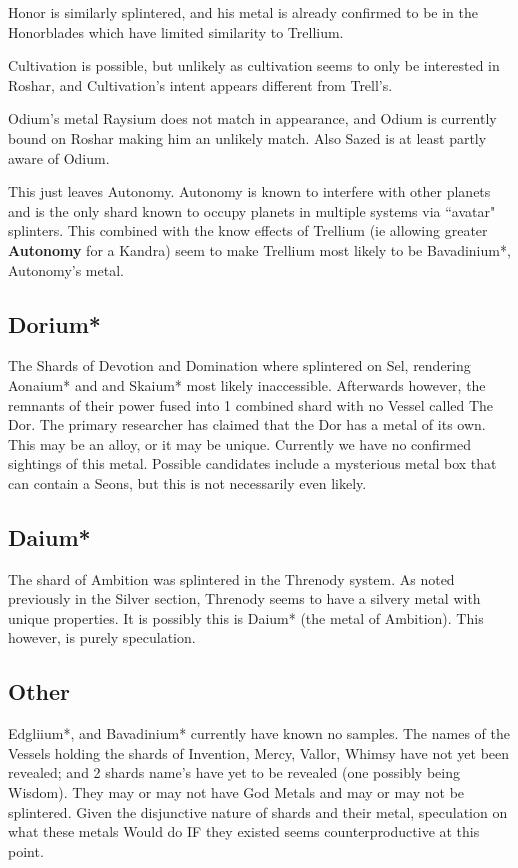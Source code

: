 \documentclass[conference]{IEEEtran}
\begin{document}
Honor is similarly splintered, and his metal is already confirmed to be in the Honorblades which have limited similarity to Trellium.

Cultivation is possible, but unlikely as cultivation seems to only be interested in Roshar, and Cultivation's intent appears different from Trell's.

Odium's metal Raysium does not match in appearance, and Odium is currently bound on Roshar making him an unlikely match.  Also Sazed is at least partly aware of Odium.

This just leaves Autonomy.  Autonomy is known to interfere with other planets and is the only shard known to occupy planets in multiple systems via ``avatar" splinters.  This combined with the know effects of Trellium (ie allowing greater \textbf{Autonomy} for a Kandra) seem to make Trellium most likely to be Bavadinium*, Autonomy's metal. 
\subsection*{Dorium*}
The Shards of Devotion and Domination where splintered on Sel, rendering Aonaium* and and Skaium* most likely inaccessible.  Afterwards however, the remnants of their power fused into 1 combined shard with no Vessel called The Dor.  The primary researcher has claimed that the Dor has a metal of its own.  This may be an alloy, or it may be unique.  Currently we have no confirmed sightings of this metal.  Possible candidates include a mysterious metal box that can contain a Seons, but this is not necessarily even likely.  
\subsection*{Daium*}
The shard of Ambition was splintered in the Threnody system.  As noted previously in the Silver section, Threnody seems to have a silvery metal with unique properties.  It is possibly this is Daium* (the metal of Ambition).  This however, is purely speculation. 

\subsection*{Other}
Edgliium*, and Bavadinium* currently have known no samples.
The names of the Vessels holding the shards of Invention, Mercy, Vallor, Whimsy have not yet been revealed; and 2 shards name's have yet to be revealed (one possibly being Wisdom).  They may or may not have God Metals and may or may not be splintered.  Given the disjunctive nature of shards and their metal, speculation on what these metals Would do IF they existed seems counterproductive at this point.  
\end{document}
